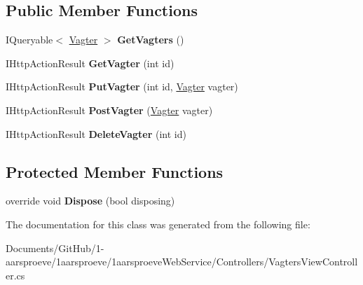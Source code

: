 \subsection*{Public Member Functions}
\begin{DoxyCompactItemize}
\item 
\hypertarget{class__1aarsproeve_web_service_1_1_controllers_1_1_vagters_view_controller_ab1f11fa916c63c696b653131577c73c4}{}I\+Queryable$<$ \hyperlink{class__1aarsproeve_web_service_1_1_vagter}{Vagter} $>$ {\bfseries Get\+Vagters} ()\label{class__1aarsproeve_web_service_1_1_controllers_1_1_vagters_view_controller_ab1f11fa916c63c696b653131577c73c4}

\item 
\hypertarget{class__1aarsproeve_web_service_1_1_controllers_1_1_vagters_view_controller_a31afbb843b9036c2a0de84bae8a41d9a}{}I\+Http\+Action\+Result {\bfseries Get\+Vagter} (int id)\label{class__1aarsproeve_web_service_1_1_controllers_1_1_vagters_view_controller_a31afbb843b9036c2a0de84bae8a41d9a}

\item 
\hypertarget{class__1aarsproeve_web_service_1_1_controllers_1_1_vagters_view_controller_a2890a8662d5834162903aa1b3baec06f}{}I\+Http\+Action\+Result {\bfseries Put\+Vagter} (int id, \hyperlink{class__1aarsproeve_web_service_1_1_vagter}{Vagter} vagter)\label{class__1aarsproeve_web_service_1_1_controllers_1_1_vagters_view_controller_a2890a8662d5834162903aa1b3baec06f}

\item 
\hypertarget{class__1aarsproeve_web_service_1_1_controllers_1_1_vagters_view_controller_ad2f51f1def0a853e75c0ecca9ebe39eb}{}I\+Http\+Action\+Result {\bfseries Post\+Vagter} (\hyperlink{class__1aarsproeve_web_service_1_1_vagter}{Vagter} vagter)\label{class__1aarsproeve_web_service_1_1_controllers_1_1_vagters_view_controller_ad2f51f1def0a853e75c0ecca9ebe39eb}

\item 
\hypertarget{class__1aarsproeve_web_service_1_1_controllers_1_1_vagters_view_controller_a4766a94da5ba99caa1a655c43a1b79e0}{}I\+Http\+Action\+Result {\bfseries Delete\+Vagter} (int id)\label{class__1aarsproeve_web_service_1_1_controllers_1_1_vagters_view_controller_a4766a94da5ba99caa1a655c43a1b79e0}

\end{DoxyCompactItemize}
\subsection*{Protected Member Functions}
\begin{DoxyCompactItemize}
\item 
\hypertarget{class__1aarsproeve_web_service_1_1_controllers_1_1_vagters_view_controller_a4adefda43ee7a37a27874d8d1809855c}{}override void {\bfseries Dispose} (bool disposing)\label{class__1aarsproeve_web_service_1_1_controllers_1_1_vagters_view_controller_a4adefda43ee7a37a27874d8d1809855c}

\end{DoxyCompactItemize}


The documentation for this class was generated from the following file\+:\begin{DoxyCompactItemize}
\item 
Documents/\+Git\+Hub/1-\/aarsproeve/1aarsproeve/1aarsproeve\+Web\+Service/\+Controllers/Vagters\+View\+Controller.\+cs\end{DoxyCompactItemize}
